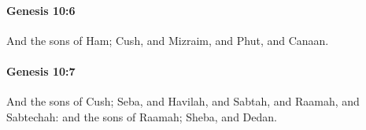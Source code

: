		\paragraph{Genesis 10:6} %
			\label{GENESIS-10-6}

			And the sons of Ham; Cush, and Mizraim, and Phut, and Canaan.


		\paragraph{Genesis 10:7} %
			\label{GENESIS-10-7}

			And the sons of Cush; Seba, and Havilah, and Sabtah, and Raamah, and Sabtechah: and the sons of Raamah; Sheba, and Dedan.


